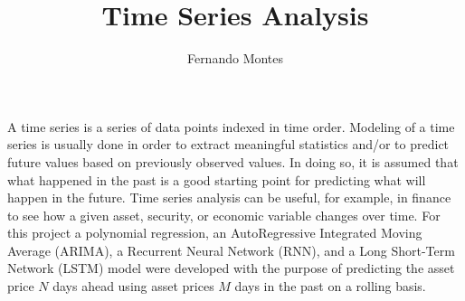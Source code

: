 \documentclass[11pt]{article}
\title{Time Series Analysis\vspace{-0.5em}}
\author{Fernando Montes}
\date{}
\begin{document}
    \maketitle
A time series is a series of data points indexed in time order. Modeling of a time series is usually done in order to extract meaningful statistics and/or to predict future values based on previously observed values. In doing so, it is assumed that what happened in the past is a good starting point for predicting what will happen in the future. Time series analysis can be useful, for example, in finance to see how a given asset, security, or economic variable changes over time. For this project a polynomial regression, an AutoRegressive Integrated Moving Average (ARIMA), a Recurrent Neural Network (RNN), and a Long Short-Term Network (LSTM) model were developed with the purpose of predicting the asset price \(N\) days ahead using asset prices \(M\) days in the past on a rolling basis.
\\
\end{document}
